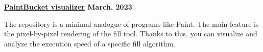 \textbf{\href{https://github.com/jirol9xa/PaintBucketAlgorithms} {PaintBucket visualizer} \hfill  March, 2023} \par
\begin{itemize}
The repository is a minimal analogue of programs like Paint. The main feature is the pixel-by-pixel rendering of the fill tool. Thanks to this, you can visualize and analyze the execution speed of a specific fill algorithm.
\end{itemize} \par